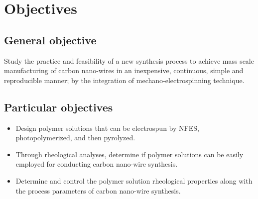
\chapter{Objectives} %

\label{Chapter:Objectives}


\section{General objective}
Study the practice and feasibility of a new synthesis process to achieve mass scale manufacturing of carbon nano-wires in an inexpensive, continuous, simple and reproducible manner; by the integration of mechano-electrospinning technique.

\section{Particular objectives}

\begin{itemize}
	\item{
	Design polymer solutions that can be electrospun by NFES, photopolymerized, and then pyrolyzed.
    }
    \item{
    Through rheological analyses, determine if polymer solutions can be easily employed for conducting carbon nano-wire synthesis.
    }
    \item{
    Determine and control the polymer solution rheological properties along with the process parameters of carbon nano-wire synthesis.
    }
\end{itemize}




